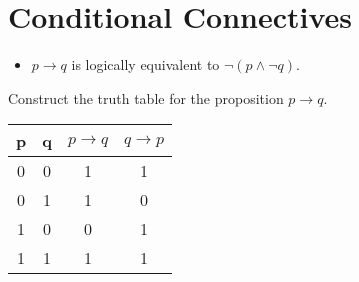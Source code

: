 \documentclass{article}
\begin{document}
\LARGE
\section{Conditional Connectives}
\begin{itemize}
	\item $p \rightarrow q$ is logically equivalent to $\neg(p \wedge \neg q)$.
\end{itemize}

Construct the truth table for the proposition $p \rightarrow q$.

\begin{center}
\begin{tabular}{|c|c|c|c|}
\hline
p & q & $p \rightarrow q$ & $q \rightarrow p$ \\
\hline
\phantom{sp}0\phantom{sp} & \phantom{sp}0\phantom{sp} & 1& 1 \\
0 & 1 & 1 & 0 \\
1 & 0 & 0 & 1 \\
1 & 1 & 1 & 1 \\
\hline
\end{tabular}
\end{center}

\phantom{sp}
\end{document}
